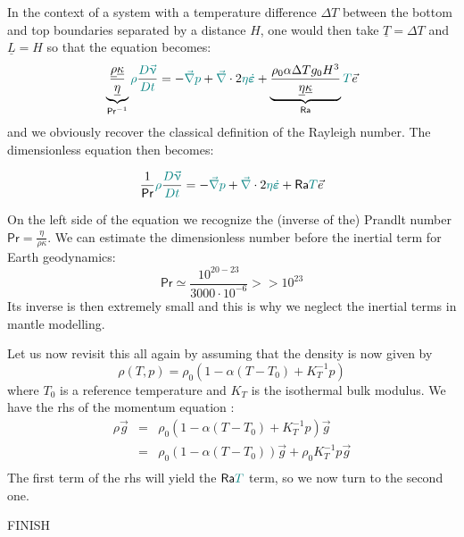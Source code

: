 \documentclass[a4paper,11pt]{article}
\newcommand{\nn}{\nonumber}
\newcommand{\Ranb}{{\mathsf{Ra}}}
\newcommand{\Prnb}{{\mathsf{Pr}}}
\begin{document}
In the context of a system with a temperature difference $\Delta T$ 
between the bottom and top boundaries separated by a distance $H$, one would then take $\underline{T} = \Delta T$ 
and $\underline{L}=H$ so that the equation becomes:
\[
\underbrace{\frac{\underline{\rho} \underline{\kappa}}{\underline{\eta}}}_{\Prnb^{-1}}
{\color{teal}\rho} \frac{{\color{teal} D \vec\upnu}}{\color{teal} D t}
=
-{\color{teal} \vec\nabla} {\color{teal}p} + {\color{teal} \vec\nabla} \cdot 2 {\color{teal} \eta} {\color{teal} \dot{\bm\varepsilon}}
+ \underbrace{\frac{\rho_0\alpha \Delta T g_0 H^3}{\underline{\eta} \underline{\kappa}} }_{\Ranb} {\color{teal} T}\vec{e}
\]
and we obviously recover the classical definition of the Rayleigh number.
The dimensionless equation then becomes:
\begin{mdframed}[backgroundcolor=blue!5]
\[
\frac{1}{\Prnb}
{\color{teal}\rho} \frac{{\color{teal} D \vec\upnu}}{\color{teal} D t}
=
-{\color{teal} \vec\nabla} {\color{teal}p} + {\color{teal} \vec\nabla} \cdot 2 {\color{teal} \eta} {\color{teal} \dot{\bm\varepsilon}}
+ \Ranb {\color{teal} T}\vec{e}
\]
\end{mdframed}


On the left side of the equation we recognize the (inverse of the) Prandlt number $\Prnb=\frac{\eta}{\rho \kappa}$. 
We can estimate the dimensionless number before the inertial term for Earth
geodynamics:
\[
\Prnb \simeq \frac{10^{20-23}}{3000 \cdot 10^{-6}} >> 10^{23}
\]
Its inverse is then extremely small and this is why we neglect the inertial terms
in mantle modelling.

Let us now revisit this all again by assuming that the density is now 
given by 
\[
\rho(T,p)= \rho_0( 1 -\alpha (T-T_0) + K_T^{-1} p )
\]
where $T_0$ is a reference temperature and $K_T$ is the isothermal bulk modulus.
We have the rhs of the momentum equation :
\begin{eqnarray}
\rho \vec{g} 
&=& \rho_0( 1 -\alpha (T-T_0) + K_T^{-1} p ) \vec{g} \nn\\
&=& \rho_0( 1 -\alpha (T-T_0) ) \vec{g} +  \rho_0 K_T^{-1} p  \vec{g} \nn\\
\end{eqnarray}
The first term of the rhs will yield the $\Ranb {\color{teal}T}$ term, so we now turn to the second one.

{\color{red} FINISH}

\end{document}
